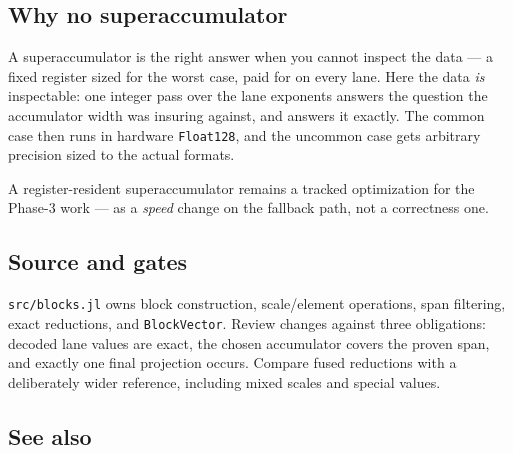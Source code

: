\subsection{Why no superaccumulator}



\label{12327229500932627957}{}


A superaccumulator is the right answer when you cannot inspect the data — a fixed register sized for the worst case, paid for on every lane. Here the data \emph{is} inspectable: one integer pass over the lane exponents answers the question the accumulator width was insuring against, and answers it exactly. The common case then runs in hardware \texttt{Float128}, and the uncommon case gets arbitrary precision sized to the actual formats.



A register-resident superaccumulator remains a tracked optimization for the Phase-3 work — as a \emph{speed} change on the fallback path, not a correctness one.



\subsection{Source and gates}



\label{13106405904108779198-dup1}{}


\texttt{src/blocks.jl} owns block construction, scale/element operations, span filtering, exact reductions, and \texttt{BlockVector}. Review changes against three obligations: decoded lane values are exact, the chosen accumulator covers the proven span, and exactly one final projection occurs. Compare fused reductions with a deliberately wider reference, including mixed scales and special values.



\subsection{See also}



\label{292862844209942199-dup20}{}


